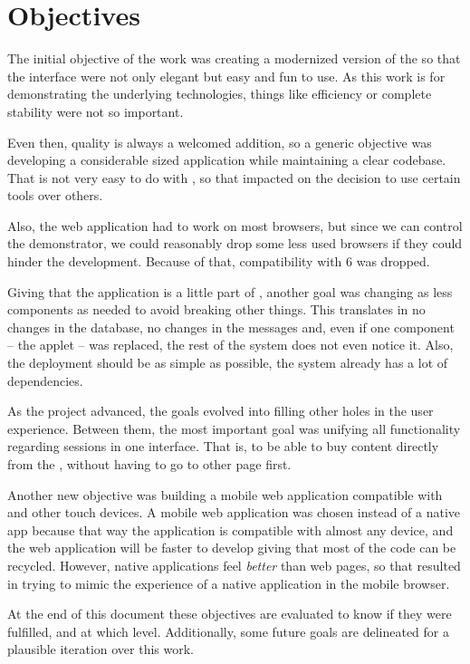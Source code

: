 \section{Objectives} %
\label{sec:objectives}

The initial objective of the work was creating a modernized version of the  so that the interface were not only elegant but easy and fun to use.
As this work is for demonstrating the underlying technologies, things like efficiency or complete stability were not so important.

Even then, quality is always a welcomed addition, so a generic objective was developing a considerable sized  application while maintaining a clear codebase.
That is not very easy to do with , so that impacted on the decision to use certain tools over others.

Also, the web application had to work on most browsers, but since we can control the demonstrator, we could reasonably drop some less used browsers if they could hinder the development.
Because of that, compatibility with  6 was dropped.

Giving that the  application is a little part of , another goal was changing as less components as needed to avoid breaking other things.
This translates in no changes in the database, no changes in the messages and, even if one component -- the applet -- was replaced, the rest of the system does not even notice it.
Also, the deployment should be as simple as possible, the system already has a lot of dependencies.

As the project advanced, the goals evolved into filling other holes in the user experience.
Between them, the most important goal was unifying all functionality regarding sessions in one interface.
That is, to be able to buy content directly from the , without having to go to other page first.

Another new objective was building a mobile web application compatible with  and other touch devices.
A mobile web application was chosen instead of a native app because that way the application is compatible with almost any device, and the web application will be faster to develop giving that most of the code can be recycled.
However, native applications feel \emph{better} than web pages, so that resulted in trying to mimic the experience of a native application in the mobile browser.

At the end of this document these objectives are evaluated to know if they were fulfilled, and at which level.
Additionally, some future goals are delineated for a plausible iteration over this work.
